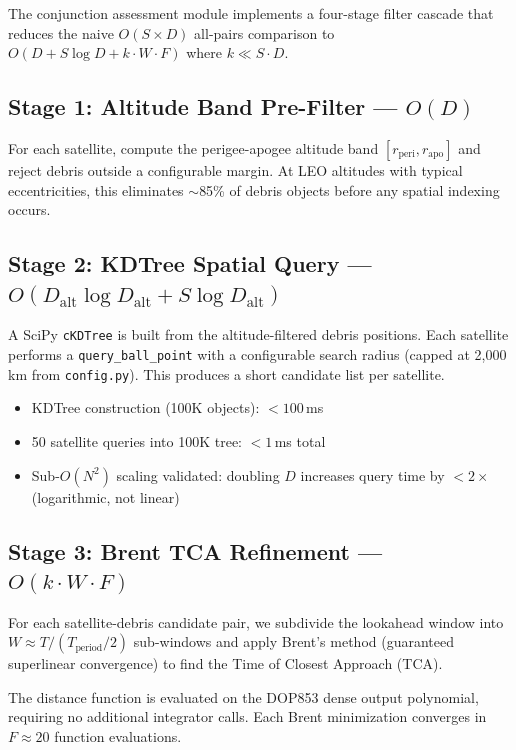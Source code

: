 \documentclass[11pt,a4paper]{article}
\begin{document}
The conjunction assessment module implements a four-stage filter cascade that
reduces the naive $O(S \times D)$ all-pairs comparison to
$O(D + S \log D + k \cdot W \cdot F)$ where $k \ll S \cdot D$.

\subsection{Stage 1: Altitude Band Pre-Filter --- $O(D)$}

For each satellite, compute the perigee-apogee altitude band
$[r_\text{peri}, r_\text{apo}]$ and reject debris outside a configurable
margin. At LEO altitudes with typical eccentricities, this eliminates
$\sim$85\% of debris objects before any spatial indexing occurs.

\subsection{Stage 2: KDTree Spatial Query --- $O(D_\text{alt} \log D_\text{alt} + S \log D_\text{alt})$}

A SciPy \texttt{cKDTree} is built from the altitude-filtered debris positions.
Each satellite performs a \texttt{query\_ball\_point} with a configurable search
radius (capped at 2,000\,km from \texttt{config.py}). This produces a short
candidate list per satellite.

\begin{itemize}[nosep]
  \item KDTree construction (100K objects): $< 100$\,ms
  \item 50 satellite queries into 100K tree: $< 1$\,ms total
  \item Sub-$O(N^2)$ scaling validated: doubling $D$ increases query time by
        $< 2\times$ (logarithmic, not linear)
\end{itemize}

\subsection{Stage 3: Brent TCA Refinement --- $O(k \cdot W \cdot F)$}

For each satellite-debris candidate pair, we subdivide the lookahead window
into $W \approx T / (T_\text{period}/2)$ sub-windows and apply Brent's method
(guaranteed superlinear convergence) to find the Time of Closest Approach (TCA).

The distance function is evaluated on the DOP853 dense output polynomial,
requiring no additional integrator calls. Each Brent minimization converges
in $F \approx 20$ function evaluations.
\end{document}

